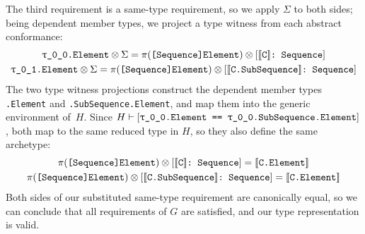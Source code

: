 \documentclass[../generics]{subfiles}
\begin{document}
\begin{example}
The third requirement is a same-type requirement, so we apply $\Sigma$ to both sides; being dependent member types, we project a type witness from each abstract conformance:
\begin{gather*}
\texttt{\texttt{$\uptau$\_0\_0}.Element}\otimes\Sigma=\pi(\texttt{[Sequence]Element})\otimes[\texttt{$[\![\texttt{C}]\!]$:~Sequence}]\\
\texttt{\texttt{$\uptau$\_0\_1}.Element}\otimes\Sigma=\pi(\texttt{[Sequence]Element})\otimes[\texttt{$[\![\texttt{C.SubSequence}]\!]$:~Sequence}]
\end{gather*}
The two type witness projections construct the dependent member types \texttt{.Element} and \texttt{.SubSequence.Element}, and map them into the generic environment of~$H$. Since $H\vdash[\texttt{\texttt{$\uptau$\_0\_0}.Element == \texttt{$\uptau$\_0\_0}.SubSequence.Element}]$, both map to the same reduced type in $H$, so they also define the same archetype:
\begin{gather*}
\AssocType{[Sequence]Element}\otimes\ConfReq{$\archetype{C}$}{Sequence}=\archetype{C.Element}\\
\AssocType{[Sequence]Element}\otimes\ConfReq{$\archetype{C.SubSequence}$}{Sequence}=\archetype{C.Element}
\end{gather*}
Both sides of our substituted same-type requirement are canonically equal, so we can conclude that all requirements of $G$ are satisfied, and our type representation is valid.
\end{example}
\end{document}
